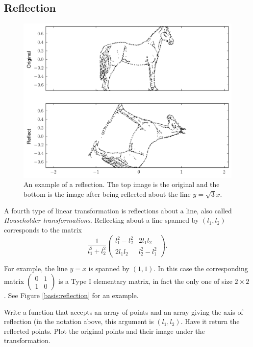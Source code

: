 \subsection*{Reflection}

\begin{figure}
\includegraphics[width=\textwidth]{reflect.pdf}
\caption{An example of a reflection. The top image is the original and the bottom is the image after being reflected about the line $y = \sqrt{3}x$.}
\label{basis:reflect}
\end{figure}
A fourth type of linear transformation is reflections about a line, also called \emph{Householder transformations}. Reflecting about a line spanned by $(l_1, l_2)$ corresponds to the matrix
\[
\frac{1}{l_1^2 + l_2^2}
\begin{pmatrix}
l_1^2 - l_2^2 & 2l_1l_2 \\
2l_1l_2 & l_2^2 - l_1^2
\end{pmatrix}.
\]

For example, the line $y=x$ is spanned by $(1, 1)$. In this case the corresponding matrix $\begin{pmatrix}
0 & 1\\
1 & 0
\end{pmatrix}$ is a Type I elementary matrix, in fact the only one of size $2 \times 2$. See Figure \ref{basis:reflection} for an example.

\begin{problem}
Write a function that accepts an array of points and an array giving the axis of reflection (in the notation above, this argument is $(l_1, l_2)$. Have it return the reflected points.
Plot the original points and their image under the transformation.
\end{problem}

